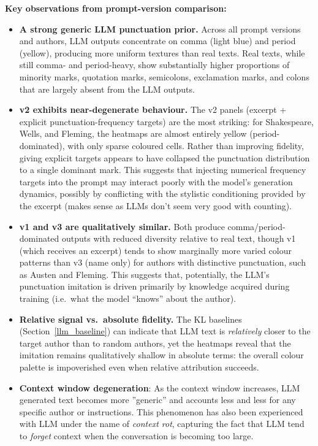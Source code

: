 \documentclass{article}
\begin{document}
\textbf{Key observations from prompt-version comparison:}
\begin{itemize}
    \item \textbf{A strong generic LLM punctuation prior.} Across all prompt versions and authors, LLM outputs concentrate on comma (light blue) and period (yellow), producing more uniform textures than real texts. Real texts, while still comma- and period-heavy, show substantially higher proportions of minority marks, quotation marks, semicolons, exclamation marks, and colons  that are largely absent from the LLM outputs.

    \item \textbf{v2 exhibits near-degenerate behaviour.} The v2 panels (excerpt + explicit punctuation-frequency targets) are the most striking: for Shakespeare, Wells, and Fleming, the heatmaps are almost entirely yellow (period-dominated), with only sparse coloured cells. Rather than improving fidelity, giving explicit targets appears to have collapsed the punctuation distribution to a single dominant mark. This suggests that injecting numerical frequency targets into the prompt may interact poorly with the model's generation dynamics, possibly by conflicting with the stylistic conditioning provided by the excerpt (makes sense as LLMs don't seem very good with counting).

    \item \textbf{v1 and v3 are qualitatively similar.} Both produce comma/period-dominated outputs with reduced diversity relative to real text, though v1 (which receives an excerpt) tends to show marginally more varied colour patterns than v3 (name only) for authors with distinctive punctuation, such as Austen and Fleming. This suggests that, potentially, the LLM's punctuation imitation is driven primarily by knowledge acquired during training (i.e.\ what the model ``knows'' about the author).

    \item \textbf{Relative signal vs.\ absolute fidelity.} The KL baselines (Section~\ref{llm_baseline}) can indicate that LLM text is \emph{relatively} closer to the target author than to random authors, yet the heatmaps reveal that the imitation remains qualitatively shallow in absolute terms: the overall colour palette is impoverished even when relative attribution succeeds.

    \item \textbf{Context window degeneration}: As the context window increases, LLM generated text becomes more ”generic” and accounts less and less for any specific author or instructions. This phenomenon has also been experienced with LLM under the name of \textit{context rot}, capturing the fact that LLM tend to \textit{forget} context when the conversation is becoming too large.
\end{itemize}
\end{document}
